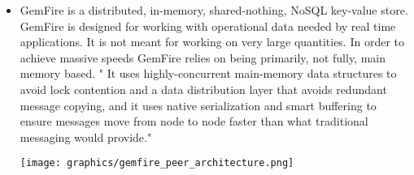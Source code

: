 \documentclass[letterpaper, 12pt]{article}
\begin{document}
\begin{itemize}
  \item GemFire is a distributed, in-memory, shared-nothing, NoSQL key-value store.
  GemFire is designed for working with operational data needed by real time 
  applications. It is not meant for working on very large quantities. In order to 
  achieve massive speeds GemFire relies on being primarily, not fully, 
  main memory based. " It uses highly-concurrent main-memory data structures to avoid
  lock contention and a data distribution
  layer that avoids redundant message copying, and it uses native serialization and
  smart buffering to ensure messages move from node to node faster than what
  traditional messaging would provide."\cite{gemfire}
  \par\vspace{\baselineskip}
  \texttt{[image: graphics/gemfire\_peer\_architecture.png]}
  \par\vspace{\baselineskip}
  

\end{itemize}
\end{document}
